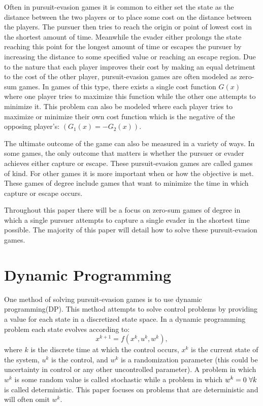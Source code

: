 Often in pursuit-evasion games it is common to either set the state as the distance between the two players or to place some cost on the distance between the players. The pursuer then tries to reach the origin or point of lowest cost in the shortest amount of time. Meanwhile the evader either prolongs the state reaching this point for the longest amount of time or escapes the pursuer by increasing the distance to some specified value or reaching an escape region. Due to the nature that each player improves their cost by making an equal detriment to the cost of the other player, pursuit-evasion games are often modeled as zero-sum games. In games of this type, there exists a single cost function $G(x)$ where one player tries to maximize this function while the other one attempts to minimize it. This problem can also be modeled where each player tries to maximize or minimize their own cost function which is the negative of the opposing player's: $(G_1(x) = -G_2(x))$.

The ultimate outcome of the game can also be measured in a variety of ways. In some games, the only outcome that matters is whether the pursuer or evader achieves either capture or escape. These pursuit-evasion games are called games of kind. For other games it is more important when or how the objective is met. These games of degree include games that want to minimize the time in which capture or escape occurs. \cite{isaacs}

Throughout this paper there will be a focus on zero-sum games of degree in which a single pursuer attempts to capture a single evader in the shortest time possible. The majority of this paper will detail how to solve these pursuit-evasion games.

\section{Dynamic Programming}

One method of solving pursuit-evasion games is to use dynamic programming(DP). This method attempts to solve control problems by providing a value for each state in a discretized state space. In a dynamic programming problem each state evolves according to:
\begin{equation}
x^{k+1}=f(x^k,u^k,w^k),
\end{equation} 
where $k$ is the discrete time at which the control occurs, $x^k$ is the current state of the system, $u^k$ is the control, and $w^k$ is a randomization parameter (this could be uncertainty in control or any other uncontrolled parameter). A problem in which $w^k$ is some random value is called stochastic while a problem in which $w^k = 0 \textnormal{ } \forall k$ is called deterministic. This paper focuses on problems that are deterministic and will often omit $w^k$.


